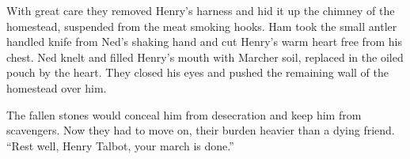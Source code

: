 \documentclass[twoside,11pt,b5paper,twocolumn]{scrbook}
\begin{document}
With great care they removed Henry's harness and hid it up the chimney of the homestead, suspended from the meat smoking hooks. Ham took the small antler handled knife from Ned's shaking hand and cut Henry's warm heart free from his chest. Ned knelt and filled Henry's mouth with Marcher soil, replaced in the oiled pouch by the heart. They closed his eyes and pushed the remaining wall of the homestead over him.

The fallen stones would conceal him from desecration and keep him from scavengers. Now they had to move on, their burden heavier than a dying friend.
“Rest well, Henry Talbot, your march is done.”
\end{document}
